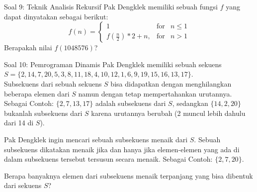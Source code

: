 \documentclass[english,t]{beamer}
\begin{document}
\begin{frame}{Soal 9: Teknik Analisis Rekursif}
Pak Dengklek memiliki sebuah fungsi $f$ yang dapat dinyatakan sebagai berikut:
\begin{equation*}
f(n) =
\left\{ \begin{array}{rcl}
1                       & \mbox{for} & n \leq 1 \\ 
f(\frac{n}{2}) * 2 + n, & \mbox{for} & n > 1
\end{array}\right.
\end{equation*}
Berapakah nilai $f(1048576)$?
\end{frame}


\begin{frame}{Soal 10: Pemrograman Dinamis}
Pak Dengklek memiliki sebuah sekuens $S = \{2, 14, 7, 20, 5, 3, 8, 11, 18, 4, 10, 12, 1, 6, 9, 19, 15, 16, 13, 17\}$. \\
Subsekuens dari sebuah sekuens $S$ bisa didapatkan dengan menghilangkan beberapa elemen dari $S$ namun dengan tetap mempertahankan urutannya. Sebagai Contoh: $\{2, 7, 13, 17\}$ adalah subsekuens dari $S$, sedangkan $\{14, 2, 20\}$ bukanlah subsekuens dari $S$ karena urutannya berubah (2 muncul lebih dahulu dari 14 di $S$).

\bigskip
Pak Dengklek ingin mencari sebuah subsekuens menaik dari $S$. Sebuah subsekuens dikatakan menaik jika dan hanya jika elemen-elemen yang ada di dalam subsekuens tersebut tersusun secara menaik. Sebagai Contoh: $\{2, 7, 20\}$. 

\bigskip
Berapa banyaknya elemen dari subsekuens menaik terpanjang yang bisa dibentuk dari sekuens $S$?
\end{frame}





   

%
%    
\end{document}
